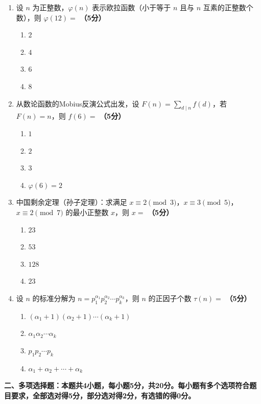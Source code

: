 \documentclass[12pt, a4paper]{ctexart}
\newcommand{\score}[1]{\hfill\textbf{（#1分）}}
\begin{document}
\begin{enumerate}
\item 设 $n$ 为正整数，$\varphi(n)$ 表示欧拉函数（小于等于 $n$ 且与 $n$ 互素的正整数个数），则 $\varphi(12)=$ \score{5}
\begin{enumerate}[label=\Alph*.]
    \item $2$
    \item $4$
    \item $6$
    \item $8$
\end{enumerate}

\item 从数论函数的Mobius反演公式出发，设 $F(n)=\displaystyle\sum_{d\mid n}f(d)$，若 $F(n)=n$，则 $f(6)=$ \score{5}
\begin{enumerate}[label=\Alph*.]
    \item $1$
    \item $2$
    \item $3$
    \item $\varphi(6)=2$
\end{enumerate}

\item 中国剩余定理（孙子定理）：求满足 $x\equiv 2\pmod{3}$，$x\equiv 3\pmod{5}$，$x\equiv 2\pmod{7}$ 的最小正整数 $x$，则 $x=$ \score{5}
\begin{enumerate}[label=\Alph*.]
    \item $23$
    \item $53$
    \item $128$
    \item $23$
\end{enumerate}

\item 设 $n$ 的标准分解为 $n=p_1^{\alpha_1}p_2^{\alpha_2}\cdots p_k^{\alpha_k}$，则 $n$ 的正因子个数 $\tau(n)=$ \score{5}
\begin{enumerate}[label=\Alph*.]
    \item $(\alpha_1+1)(\alpha_2+1)\cdots(\alpha_k+1)$
    \item $\alpha_1\alpha_2\cdots\alpha_k$
    \item $p_1p_2\cdots p_k$
    \item $\alpha_1+\alpha_2+\cdots+\alpha_k$
\end{enumerate}

\end{enumerate}

\vspace{10pt}

{\large\bfseries 二、多项选择题：本题共4小题，每小题5分，共20分。每小题有多个选项符合题目要求，全部选对得5分，部分选对得2分，有选错的得0分。}
\end{document}
